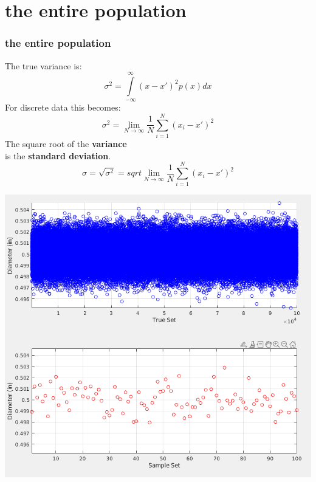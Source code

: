 \documentclass[fleqn]{beamer} %
\newcommand{\sectiontitleII}{the entire population}
\begin{document}
\section{\sectiontitleII}	
	\begin{frame}[label=sectionII] \small
		\frametitle{\sectiontitleII}    
		
		\begin{multicols}{2} \tiny
		The true variance is:\\
		\[ \sigma^2=\int\limits_{-\infty}^{\infty}(x-x')^2p(x)dx \]
		For discrete data this becomes:\\
		\[ \sigma^2=\lim\limits_{N\rightarrow \infty}\frac{1}{N}\sum\limits_{i=1}^{N}(x_i-x')^2 \]
		The square root of the {\bf \B variance} \\
		is the {\bf \PR standard deviation}. \\
		\[\sigma=\sqrt{\sigma^2}=sqrt{\lim\limits_{N\rightarrow \infty}\frac{1}{N}\sum\limits_{i=1}^{N}(x_i-x')^2}\]

		\hspace*{0cm}\includegraphics[scale=.20]{topic4_fig1.png}		
		
		\end{multicols}
		
	\end{frame}
	
%		
%		
\end{document}
